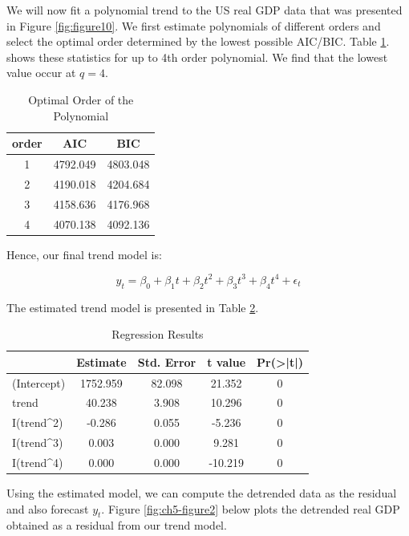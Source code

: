 \documentclass[]{book}
\theoremstyle{definition}
\theoremstyle{definition}
\theoremstyle{definition}
\theoremstyle{remark}
\begin{document}
We will now fit a polynomial trend to the US real GDP data that was presented in Figure \ref{fig:figure10}. We first estimate polynomials of different orders and select the optimal order determined by the lowest possible AIC/BIC. Table \ref{tab:ch5-table1}. shows these statistics for up to 4th order polynomial. We find that the lowest value occur at \(q=4\).

\begin{table}[t]

\caption{\label{tab:ch5-table1}Optimal Order of the Polynomial}
\centering
\begin{tabular}{ccc}
\toprule
order & AIC & BIC\\
\midrule
1 & 4792.049 & 4803.048\\
2 & 4190.018 & 4204.684\\
3 & 4158.636 & 4176.968\\
4 & 4070.138 & 4092.136\\
\bottomrule
\end{tabular}
\end{table}

Hence, our final trend model is:

\begin{equation}
y_t=\beta_0 +\beta_1 t + \beta_2 t^2 + \beta_3 t^3 + \beta_4 t^4 +\epsilon_t
\end{equation}

The estimated trend model is presented in Table \ref{tab:ch5-table2}.

\begin{table}[t]

\caption{\label{tab:ch5-table2}Regression Results}
\centering
\begin{tabular}{lcccc}
\toprule
  & Estimate & Std. Error & t value & Pr(>|t|)\\
\midrule
(Intercept) & 1752.959 & 82.098 & 21.352 & 0\\
trend & 40.238 & 3.908 & 10.296 & 0\\
I(trend\textasciicircum{}2) & -0.286 & 0.055 & -5.236 & 0\\
I(trend\textasciicircum{}3) & 0.003 & 0.000 & 9.281 & 0\\
I(trend\textasciicircum{}4) & 0.000 & 0.000 & -10.219 & 0\\
\bottomrule
\end{tabular}
\end{table}

Using the estimated model, we can compute the detrended data as the residual and also forecast \(y_t\). Figure \ref{fig:ch5-figure2} below plots the detrended real GDP obtained as a residual from our trend model.
\end{document}
